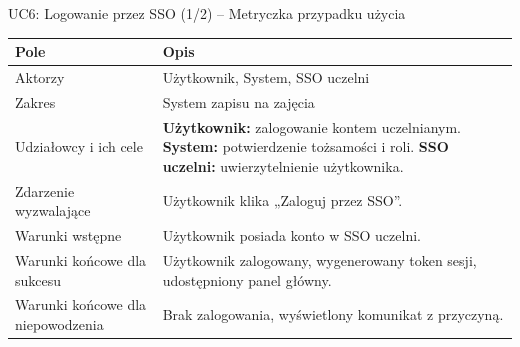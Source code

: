 \documentclass[aspectratio=169, 10pt, xcolor=table]{beamer}
\renewcommand{\arraystretch}{1.18}
\begin{document}
\begin{frame}{UC6: Logowanie przez SSO (1/2) -- Metryczka przypadku użycia}
    \scriptsize
    \renewcommand{\arraystretch}{1.18}
    \begin{tabularx}{\textwidth}{|U{3.6cm}|Y|}
        \hline
        \textcolor{NavyPrimary}{\textbf{Pole}} & \textcolor{NavyPrimary}{\textbf{Opis}} \\
        \hline
        Aktorzy & Użytkownik, System, SSO uczelni \\
        \hline
        Zakres & System zapisu na zajęcia \\
        \hline
        Udziałowcy i ich cele & \textbf{Użytkownik:} zalogowanie kontem uczelnianym. \textbf{System:} potwierdzenie tożsamości i roli. \textbf{SSO uczelni:} uwierzytelnienie użytkownika. \\
        \hline
        Zdarzenie wyzwalające & Użytkownik klika „Zaloguj przez SSO”. \\
        \hline
        Warunki wstępne & Użytkownik posiada konto w SSO uczelni. \\
        \hline
        Warunki końcowe dla sukcesu & Użytkownik zalogowany, wygenerowany token sesji, udostępniony panel główny. \\
        \hline
        Warunki końcowe dla niepowodzenia & Brak zalogowania, wyświetlony komunikat z przyczyną. \\
        \hline
    \end{tabularx}
\end{frame}
\end{document}

